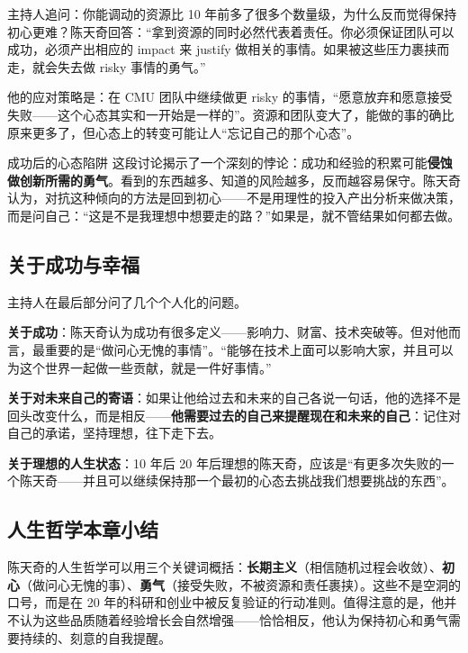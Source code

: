 \documentclass[a4paper]{article}
\begin{document}
主持人追问：你能调动的资源比 10 年前多了很多个数量级，为什么反而觉得保持初心更难？陈天奇回答：``拿到资源的同时必然代表着责任。你必须保证团队可以成功，必须产出相应的 impact 来 justify 做相关的事情。如果被这些压力裹挟而走，就会失去做 risky 事情的勇气。''

他的应对策略是：在 CMU 团队中继续做更 risky 的事情，``愿意放弃和愿意接受失败------这个心态其实和一开始是一样的''。资源和团队变大了，能做的事的确比原来更多了，但心态上的转变可能让人``忘记自己的那个心态''。

\begin{warningbox}{成功后的心态陷阱}
这段讨论揭示了一个深刻的悖论：成功和经验的积累可能\textbf{侵蚀做创新所需的勇气}。看到的东西越多、知道的风险越多，反而越容易保守。陈天奇认为，对抗这种倾向的方法是回到初心------不是用理性的投入产出分析来做决策，而是问自己：``这是不是我理想中想要走的路？''如果是，就不管结果如何都去做。
\end{warningbox}

\subsection{关于成功与幸福}

主持人在最后部分问了几个个人化的问题。

\textbf{关于成功}：陈天奇认为成功有很多定义------影响力、财富、技术突破等。但对他而言，最重要的是``做问心无愧的事情''。``能够在技术上面可以影响大家，并且可以为这个世界一起做一些贡献，就是一件好事情。''

\textbf{关于对未来自己的寄语}：如果让他给过去和未来的自己各说一句话，他的选择不是回头改变什么，而是相反------\textbf{他需要过去的自己来提醒现在和未来的自己}：记住对自己的承诺，坚持理想，往下走下去。

\textbf{关于理想的人生状态}：10 年后 20 年后理想的陈天奇，应该是``有更多次失败的一个陈天奇------并且可以继续保持那一个最初的心态去挑战我们想要挑战的东西''。

\subsection{人生哲学本章小结}

陈天奇的人生哲学可以用三个关键词概括：\textbf{长期主义}（相信随机过程会收敛）、\textbf{初心}（做问心无愧的事）、\textbf{勇气}（接受失败，不被资源和责任裹挟）。这些不是空洞的口号，而是在 20 年的科研和创业中被反复验证的行动准则。值得注意的是，他并不认为这些品质随着经验增长会自然增强------恰恰相反，他认为保持初心和勇气需要持续的、刻意的自我提醒。
\end{document}
